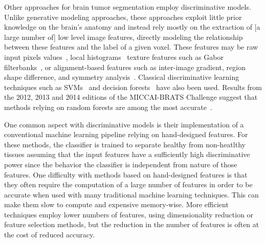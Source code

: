 \documentclass[final,5p,times,twocolumn]{elsarticle}
\begin{document}
Other approaches for brain tumor segmentation employ discriminative models.  Unlike generative modeling approaches, these approaches exploit little prior knowledge on the brain's anatomy and instead rely mostly on the extraction of [a large number of] low level image features, directly modeling the relationship between these features and the label of a given voxel.  These features may be raw input pixels values~\citep{Havaei2014,hamamci2012a}, local histograms~\citep{Kleesiek2014,Meier2014} texture features such as Gabor filterbanks~\citep{Subbanna2013,Subbanna2014}, or alignment-based features such as inter-image gradient, region shape difference, and symmetry analysis~\citep{ANTsandArboles}.  Classical discriminative learning techniques such as SVMs~\citep{Bauer2011,schmidt2005,Lee2005} and decision forests~\citep{zikic2012} %
have also been used.  Results from the 2012, 2013 and 2014 editions of the MICCAI-BRATS Challenge suggest that methods relying on random forests are among the most accurate~\citep{Menze2014,Gotz2014,Kleesiek2014}.  

 One common aspect with discriminative models is their implementation of a conventional machine learning pipeline relying on hand-designed features. For these methods, the classifier is trained to separate healthy from non-heatlthy tissues assuming that the input features have a sufficiently high discriminative power since the behavior  the classifier is independent from nature of those features.  
One difficulty with methods based on hand-designed features is that they often require the computation of a large number of features in order to be accurate when used with many traditional machine learning techniques. This can make them slow to compute and expensive memory-wise.
More efficient techniques employ lower numbers of features, using dimensionality reduction or feature selection methods, but the reduction in the number of features is often at the cost of reduced accuracy.
%
\end{document}

